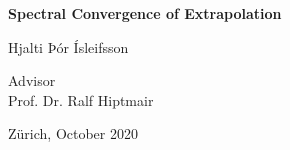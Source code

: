 \begin{titlepage}

\setcounter{page}{3}

\begin{center}

{\vspace*{90pt} \huge\bf
Spectral Convergence of Extrapolation
\par}
{\vspace{2cm} \Large 
Hjalti Þór Ísleifsson
\par}
{\vspace{2cm} \Large
Advisor\\
Prof. Dr. Ralf Hiptmair
\par}
{\vspace{2cm} \Large 
Zürich, October 2020
\par}
\end{center}
\end{titlepage}